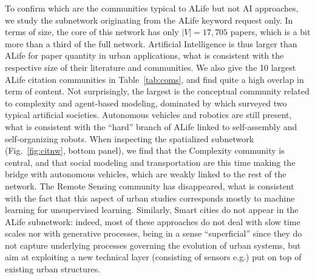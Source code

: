 \documentclass[10pt]{article}
\begin{document}
To confirm which are the communities typical to ALife but not AI approaches, we study the subnetwork originating from the ALife keyword request only. In terms of size, the core of this network has only $\left|V\right|=17,705$ papers, which is a bit more than a third of the full network. Artificial Intelligence is thus larger than ALife for paper quantity in urban applications, what is consistent with the respective size of their literature and communities. We also give the 10 largest ALife citation communities in Table~\ref{tab:coms}, and find quite a high overlap in term of content. Not surprisingly, the largest is the conceptual community related to complexity and agent-based modeling, dominated by \cite{casti1997would} which surveyed two typical artificial societies. Autonomous vehicles and robotics are still present, what is consistent with the ``hard'' branch of ALife linked to self-assembly and self-organizing robots. When inspecting the spatialized subnetwork (Fig.~\ref{fig:citnw}, bottom panel), we find that the Complexity community is central, and that social modeling and transportation are this time making the bridge with autonomous vehicles, which are weakly linked to the rest of the network. The Remote Sensing community has disappeared, what is consistent with the fact that this aspect of urban studies corresponds mostly to machine learning for unsupervised learning. Similarly, Smart cities do not appear in the ALife subnetwork: indeed, most of these approaches do not deal with slow time scales nor with generative processes, being in a sense ``superficial'' since they do not capture underlying processes governing the evolution of urban systems, but aim at exploiting a new technical layer (consisting of sensors e.g.) put on top of existing urban structures.







\end{document}
